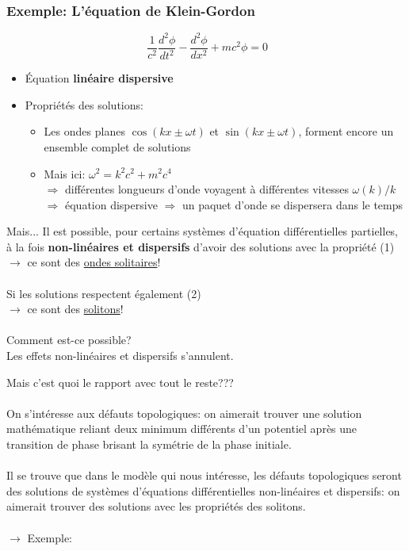 \documentclass{beamer}
\begin{document}
\begin{frame}
\frametitle{Exemple: L'équation de Klein-Gordon}
\begin{equation*}
\ \frac{1}{c^{2}} \dfrac{d^{2}\phi}{dt^{2}} - \dfrac{d^{2}\phi}{dx^{2}} + m c^{2}\phi= 0
\end{equation*}
\begin{itemize}
\item Équation \textbf{linéaire dispersive}
\item Propriétés des solutions:
      \begin{itemize}
      \item Les ondes planes $\cos(kx\pm\omega t)$ et $\sin(kx\pm\omega t)$, forment encore un ensemble complet de solutions
      \item Mais ici: $\omega^{2}=k^{2}c^{2} + m^{2}c^{4}$\\
            $\Rightarrow$ différentes longueurs d'onde voyagent à différentes vitesses $\omega(k)/k$\\
            $\Rightarrow$ équation dispersive
            $\Rightarrow$ un paquet d'onde se dispersera dans le temps
      \end{itemize}
\end{itemize}
\end{frame}

\begin{frame}
\begin{alertblock}{Mais...}
Il est possible, pour certains systèmes d'équation différentielles partielles, à la fois \textbf{non-linéaires et dispersifs} d'avoir des solutions avec la propriété (1) \\
$\rightarrow$ ce sont des \underline{ondes solitaires}!\\
~~\\
Si les solutions respectent également (2)\\
$\rightarrow$ ce sont des \underline{solitons}!\\
~~\\
Comment est-ce possible?\\
Les effets non-linéaires et dispersifs s'annulent.
\end{alertblock}
\end{frame}





\begin{frame}
Mais c'est quoi le rapport avec tout le reste???\\
~~\\
On s'intéresse aux défauts topologiques: on aimerait trouver une solution mathématique reliant deux minimum différents d'un potentiel après une transition de phase brisant la symétrie de la phase initiale.\\
~~\\
Il se trouve que dans le modèle qui nous intéresse, les défauts topologiques seront des solutions de systèmes d'équations différentielles non-linéaires et dispersifs: on aimerait trouver des solutions avec les propriétés des solitons.\\
~~\\
$\rightarrow$ Exemple: 
\end{frame}
\end{document}
